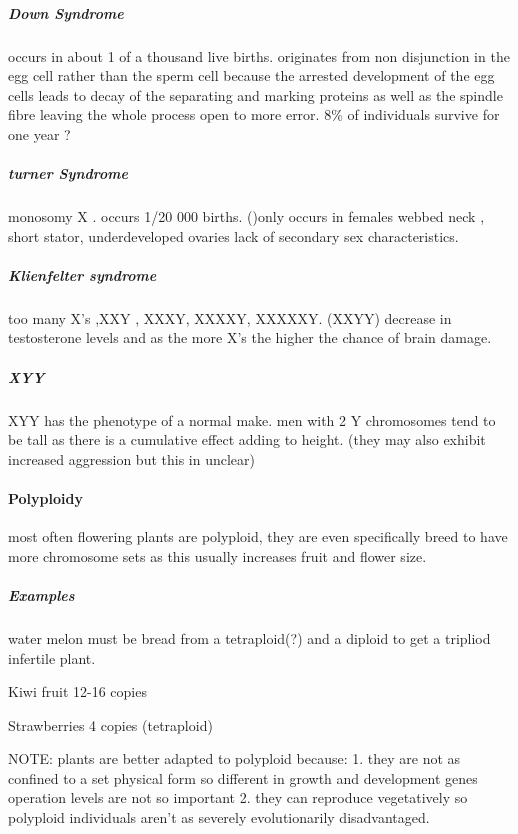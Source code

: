 \documentclass[]{article}
\let\oldparagraph\paragraph
\renewcommand{\paragraph}[1]{\oldparagraph{#1}\mbox{}}
\let\oldsubparagraph\subparagraph
\renewcommand{\subparagraph}[1]{\oldsubparagraph{#1}\mbox{}}
\begin{document}
\hypertarget{down-syndrome}{%
\subparagraph{Down Syndrome}\label{down-syndrome}}

occurs in about 1 of a thousand live births. originates from non
disjunction in the egg cell rather than the sperm cell because the
arrested development of the egg cells leads to decay of the separating
and marking proteins as well as the spindle fibre leaving the whole
process open to more error. 8\% of individuals survive for one year ?

\hypertarget{turner-syndrome}{%
\subparagraph{turner Syndrome}\label{turner-syndrome}}

monosomy X . occurs 1/20 000 births. ()only occurs in females webbed
neck , short stator, underdeveloped ovaries lack of secondary sex
characteristics.

\hypertarget{klienfelter-syndrome}{%
\subparagraph{Klienfelter syndrome}\label{klienfelter-syndrome}}

too many X's ,XXY , XXXY, XXXXY, XXXXXY. (XXYY) decrease in testosterone
levels and as the more X's the higher the chance of brain damage.

\hypertarget{xyy}{%
\subparagraph{XYY}\label{xyy}}

XYY has the phenotype of a normal make. men with 2 Y chromosomes tend to
be tall as there is a cumulative effect adding to height. (they may also
exhibit increased aggression but this in unclear)

\hypertarget{polyploidy}{%
\paragraph{Polyploidy}\label{polyploidy}}

most often flowering plants are polyploid, they are even specifically
breed to have more chromosome sets as this usually increases fruit and
flower size.

\hypertarget{examples-2}{%
\subparagraph{Examples}\label{examples-2}}

water melon must be bread from a tetraploid(?) and a diploid to get a
tripliod infertile plant.

Kiwi fruit 12-16 copies

Strawberries 4 copies (tetraploid)

NOTE: plants are better adapted to polyploid because: 1. they are not as
confined to a set physical form so different in growth and development
genes operation levels are not so important 2. they can reproduce
vegetatively so polyploid individuals aren't as severely evolutionarily
disadvantaged.
\end{document}
